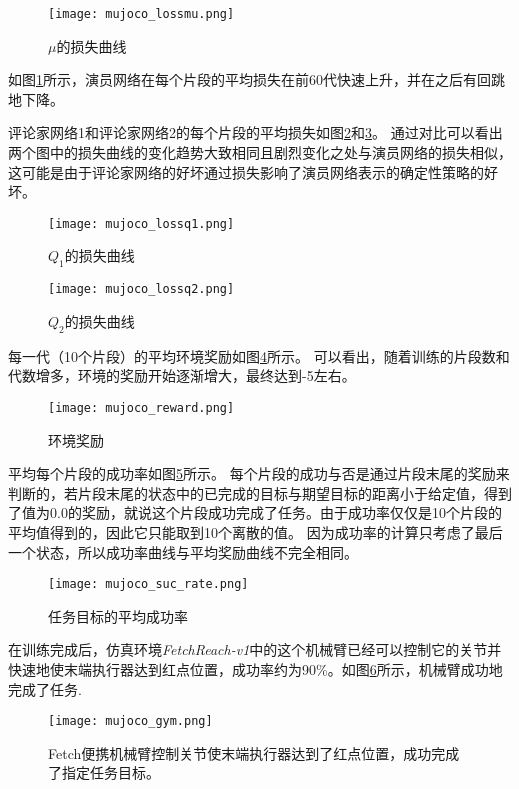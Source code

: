         \begin{figure}[htpb]
        \centering
        \texttt{[image: mujoco\_lossmu.png]}
        \caption{$\mu$的损失曲线}
            \label{mujocolossmu}
        \end{figure}

        如图\ref{mujocolossmu}所示，演员网络在每个片段的平均损失在前60代快速上升，并在之后有回跳地下降。

        评论家网络1和评论家网络2的每个片段的平均损失如图\ref{mujocolossq1}和\ref{mujocolossq2}。
        通过对比可以看出两个图中的损失曲线的变化趋势大致相同且剧烈变化之处与演员网络的损失相似，这可能是由于评论家网络的好坏通过损失影响了演员网络表示的确定性策略的好坏。

        \begin{figure}[htpb]
        \centering
        \texttt{[image: mujoco\_lossq1.png]}
        \caption{$Q_1$的损失曲线}
        \label{mujocolossq1} 
        \end{figure}

        \begin{figure}[htpb]
        \centering
        \texttt{[image: mujoco\_lossq2.png]}
        \caption{$Q_2$的损失曲线}
        \label{mujocolossq2} 
        \end{figure}

        每一代（10个片段）的平均环境奖励如图\ref{mujocoreward}所示。
        可以看出，随着训练的片段数和代数增多，环境的奖励开始逐渐增大，最终达到-5左右。
        \begin{figure}[htpb]
        \centering
        \texttt{[image: mujoco\_reward.png]}
        \caption{环境奖励}
            \label{mujocoreward}
        \end{figure}

        平均每个片段的成功率如图\ref{mujocosuc}所示。
        每个片段的成功与否是通过片段末尾的奖励来判断的，若片段末尾的状态中的已完成的目标与期望目标的距离小于给定值，得到了值为0.0的奖励，就说这个片段成功完成了任务。由于成功率仅仅是10个片段的平均值得到的，因此它只能取到10个离散的值。
        因为成功率的计算只考虑了最后一个状态，所以成功率曲线与平均奖励曲线不完全相同。
        \begin{figure}[htpb]
        \centering
        \texttt{[image: mujoco\_suc\_rate.png]}
        \caption{任务目标的平均成功率}
            \label{mujocosuc}
        \end{figure}

        在训练完成后，仿真环境\emph{FetchReach-v1}中的这个机械臂已经可以控制它的关节并快速地使末端执行器达到红点位置，成功率约为90\%。如图\ref{mujoco_gym}所示，机械臂成功地完成了任务.
        \begin{figure}[htpb]
        \centering
        \texttt{[image: mujoco\_gym.png]}
            \caption{Fetch便携机械臂控制关节使末端执行器达到了红点位置，成功完成了指定任务目标。}
            \label{mujoco_gym}
        \end{figure}


